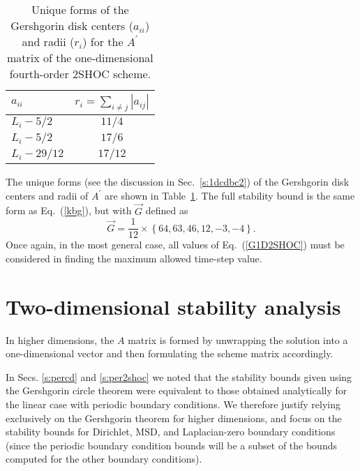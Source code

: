 \documentclass{article}
\begin{document}
\begin{table}[htbp] 
\centering
\caption{Unique forms of the Gershgorin disk centers ($a_{ii}$) and radii ($r_i$) for the $A^{\prime}$ matrix of the one-dimensional fourth-order 2SHOC scheme.}
\begin{tabular}{|l|c|} \hline
$a_{ii}$    & $r_i=\sum_{i\ne j} |a_{ij}|$ \\ \hline
$L_i - 5/2$   & $11/4$  \\
$L_i - 5/2$   & $17/6$  \\
$L_i - 29/12$ & $17/12$ \\
\hline
\end{tabular}
\label{t:1d2shocgd}
\end{table}
The unique forms (see the discussion in Sec.~\ref{s:1dcdbc2}) of the Gershgorin disk centers and radii of $A^{\prime}$ are shown in Table~\ref{t:1d2shocgd}.  The full stability bound is the same form as Eq.~(\ref{kbg}), but with $\vec G$ defined as
\begin{equation}
\label{G1D2SHOC}
\vec G = \frac{1}{12} \times \left \{64,63,46,12,-3,-4\right\}.
\end{equation}
Once again, in the most general case, all values of Eq.~(\ref{G1D2SHOC}) must be considered in finding the maximum allowed time-step value.

\section{Two-dimensional stability analysis}
\label{s:2d}
In higher dimensions, the $A$ matrix is formed by unwrapping the solution into a one-dimensional vector and then formulating the scheme matrix accordingly.  

In Secs. \ref{s:percd} and \ref{s:per2shoc} we noted that the stability bounds given using the Gershgorin circle theorem were equivalent to those obtained analytically for the linear case with periodic boundary conditions.  We therefore justify relying exclusively on the Gershgorin theorem for higher dimensions, and focus on the stability bounds for Dirichlet, MSD, and Laplacian-zero boundary conditions (since the periodic boundary condition bounds will be a subset of the bounds computed for the other boundary conditions).  
\end{document}
